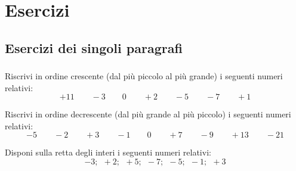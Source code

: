 
\section{Esercizi}

\subsection{Esercizi dei singoli paragrafi}

\subsubsection*{}

\vspace{-1em}

\begin{esercizio}
 \label{ese:2.1}
Riscrivi in ordine crescente (dal più piccolo al più grande) i seguenti 
numeri 
relativi:
\[+11\qquad-3\qquad0\qquad+2\qquad-5\qquad-7\qquad+1\]
\end{esercizio}

\begin{esercizio}
 \label{ese:2.2}
Riscrivi in ordine decrescente (dal più grande al più piccolo) i seguenti 
numeri 
relativi:
\[-5\qquad-2\qquad+3\qquad-1\qquad0\qquad+7\qquad-9\qquad+13\qquad-21\]
\end{esercizio}

\begin{esercizio}
 \label{ese:2.3}
Disponi sulla retta degli interi i seguenti numeri relativi:
\[-3;~~ +2;~~ +5;~~ -7;~~ -5;~~ -1;~~ +3\]
\begin{center}
\esec
\end{center}
\end{esercizio}

